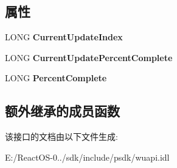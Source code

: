 \subsection*{属性}
\begin{DoxyCompactItemize}
\item 
\mbox{\label{interface_w_u_api_lib_1_1_i_installation_progress_aaff2fad7ad64be3f25e254b1454d0843}} 
L\+O\+NG {\bfseries Current\+Update\+Index}
\item 
\mbox{\label{interface_w_u_api_lib_1_1_i_installation_progress_ac603322db4decc25dde32674361b6445}} 
L\+O\+NG {\bfseries Current\+Update\+Percent\+Complete}
\item 
\mbox{\label{interface_w_u_api_lib_1_1_i_installation_progress_a96b9c2fee8b26b0b3e7ff657eddfb150}} 
L\+O\+NG {\bfseries Percent\+Complete}
\end{DoxyCompactItemize}
\subsection*{额外继承的成员函数}


该接口的文档由以下文件生成\+:\begin{DoxyCompactItemize}
\item 
E\+:/\+React\+O\+S-\/0../sdk/include/psdk/wuapi.\+idl\end{DoxyCompactItemize}
